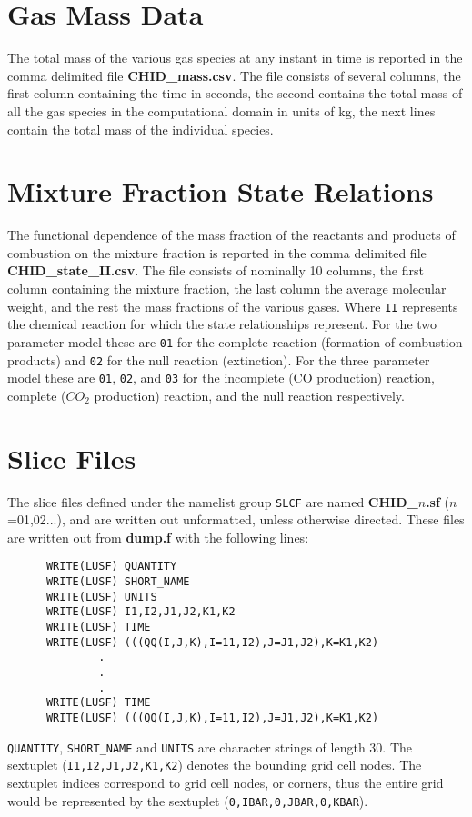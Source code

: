 \documentclass[11pt]{book}
\newcommand{\ct}{\tt\small}
\begin{document}
\section{Gas Mass Data}

The total mass of the various gas species at any instant in time
is reported in the comma delimited
file {\bf CHID\_mass.csv}. The file consists of several columns,
the first column containing the time in seconds, the second contains the
total mass of all the gas species in the computational domain in units of kg,
the next lines contain the total mass of the individual species.

\section{Mixture Fraction State Relations}

The functional dependence of the mass fraction of the reactants and
products of combustion on the mixture fraction is
reported in the comma delimited
file {\bf CHID\_state\_II.csv}. The file consists of nominally 10 columns,
the first column containing the mixture fraction, the last column the average molecular weight, and
the rest the mass fractions of the various gases.  Where {\ct II} represents the chemical reaction for
which the state relationships represent.  For the two parameter model these are {\ct 01}
for the complete reaction (formation of combustion products) and {\ct 02} for the null reaction
(extinction).  For the three parameter model these are {\ct 01}, {\ct 02}, and {\ct 03} for the
incomplete (CO production) reaction, complete ($CO_2$ production) reaction, and the null
reaction respectively.

\section{Slice Files}
\label{out:SLCF}
The slice files defined under the namelist group {\ct SLCF} are
named {\bf CHID\_$n$.sf} ($n$=01,02...),
and are written out unformatted, unless otherwise directed.
These files are written out from {\bf dump.f} with the following lines:

\footnotesize
\begin{verbatim}
      WRITE(LUSF) QUANTITY
      WRITE(LUSF) SHORT_NAME
      WRITE(LUSF) UNITS
      WRITE(LUSF) I1,I2,J1,J2,K1,K2
      WRITE(LUSF) TIME
      WRITE(LUSF) (((QQ(I,J,K),I=11,I2),J=J1,J2),K=K1,K2)
              .
              .
              .
      WRITE(LUSF) TIME
      WRITE(LUSF) (((QQ(I,J,K),I=11,I2),J=J1,J2),K=K1,K2)
\end{verbatim}
\normalsize
{\ct QUANTITY}, {\ct SHORT\_NAME} and {\ct UNITS} are
character strings of length 30.
The sextuplet ({\ct I1,I2,J1,J2,K1,K2}) denotes the bounding grid cell
nodes. The sextuplet indices correspond to grid cell
nodes, or corners, thus the entire grid would be represented by the
sextuplet ({\ct 0,IBAR,0,JBAR,0,KBAR}).
\end{document}
